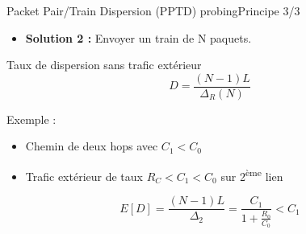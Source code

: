 \documentclass[compress]{beamer}
\begin{document}
\begin{frame}{Packet Pair/Train Dispersion (PPTD) probing}{Principe 3/3}
\begin{itemize}
	\item \textbf{Solution 2 :} Envoyer un {\color{red}train de N paquets}.
\end{itemize}
	\begin{block}{Taux de dispersion sans trafic extérieur}
		$$ D = \frac{(N-1)L}{\Delta_R(N)}$$
	\end{block}
Exemple :
\begin{itemize}
\item Chemin de deux hops avec $C_1 < C_0$
\item {\color{red}Trafic extérieur} de taux $R_C < C_1 < C_0$ sur 2\textsuperscript{ème} lien
\end{itemize} 
\vspace{10pt}
		$$ E[D] = \frac{(N-1)L}{\Delta_2} =  \frac{C_1}{1+\frac{R_0}{C_0}} < C_1$$

\end{frame}

\end{document}
